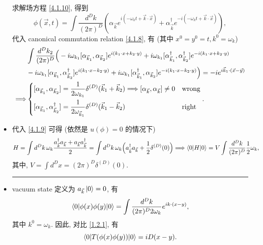 \begin{itemize}
	\begin{tcolorbox}[title=calculation:]
		求解场方程 \eqref{4.1.10}, 得到
		\begin{equation}
			\phi(\vec{x}, t) = \int \frac{d^D k}{(2 \pi)^D} (\alpha_{\vec{k}} e^{i (- \omega_k t + \vec{k} \cdot \vec{x})} + \alpha^\dag_{\vec{k}} e^{- i (- \omega_k t + \vec{k} \cdot \vec{x})}),
		\end{equation}
		代入 canonical commutation relation \eqref{4.1.8}, 有 (其中 $x^0 = y^0 = t, k^0 = \omega_k$)
		\begin{align}
			& \int \frac{d^D k_2}{(2 \pi)^D} \Big( - i \omega_{k_1} [\alpha_{\vec{k}_1}, \alpha_{\vec{k}_2}] e^{i (k_1 \cdot x + k_2 \cdot y)} + i \omega_{k_1} [\alpha^\dag_{\vec{k}_1}, \alpha^\dag_{\vec{k}_2}] e^{- i (k_1 \cdot x + k_2 \cdot y)} \notag \\
			& - i \omega_{k_1} [\alpha_{\vec{k}_1}, \alpha^\dag_{\vec{k}_2}] e^{i (k_1 \cdot x - k_2 \cdot y)} + i \omega_{k_1} [\alpha^\dag_{\vec{k}_1}, \alpha_{\vec{k}_2}] e^{- i (k_1 \cdot x - k_2 \cdot y)} \Big) = - i e^{i \vec{k}_1 \cdot (\vec{x} - \vec{y})} \notag \\
			\Longrightarrow & \begin{dcases}
				[\alpha_{\vec{k}_1}, \alpha_{\vec{k}_2}] = \frac{1}{2 \omega_{k_1}} \delta^{(D)}(\vec{k}_1 + \vec{k}_2) \Longrightarrow [\alpha_{\vec{k}}, \alpha_{\vec{k}}] \neq 0 & \text{wrong} \\
				[\alpha_{\vec{k}_1}, \alpha^\dag_{\vec{k}_2}] = \frac{1}{2 \omega_{\vec{k}_1}} \delta^{(D)}(\vec{k}_1 - \vec{k}_2) & \text{right}
			\end{dcases}.
		\end{align}
	\end{tcolorbox}
	
	\item 代入 \eqref{4.1.9} 可得 (依然是 $u(\phi) = 0$ 的情况下)
	\begin{equation} \label{4.1.15}
		H = \int d^D k \, \omega_k \frac{a^\dag_{\vec{k}} a_{\vec{k}} + a_{\vec{k}} a^\dag_{\vec{k}}}{2} = \int d^D k \, \omega_k \Big( a^\dag_{\vec{k}} a_{\vec{k}} + \frac{1}{2} \delta^{(D)}(0) \Big) \Longrightarrow \braket{0 | H | 0} = V \int \frac{d^D k}{(2 \pi)^D} \frac{1}{2} \omega_k,
	\end{equation}
	其中, $V = \int d^D x = (2 \pi)^D \delta^{(D)}(0)$.
	
	\noindent\rule[0.5ex]{\linewidth}{0.5pt} %
	
	\item vacuum state 定义为 $a_{\vec{k}} \ket{0} = 0$, 有
	\begin{equation}
		\braket{0 | \phi(x) \phi(y) | 0} = \int \frac{d^D k}{(2 \pi)^D 2 \omega_k} e^{i k \cdot (x - y)},
	\end{equation}
	其中 $k^0 = \omega_k$. 因此, 对比 \eqref{1.2.1}, 有
	\begin{equation} \label{4.1.17}
		\braket{0 | T(\phi(x) \phi(y)) | 0} = i D(x - y).
	\end{equation}
\end{itemize}

